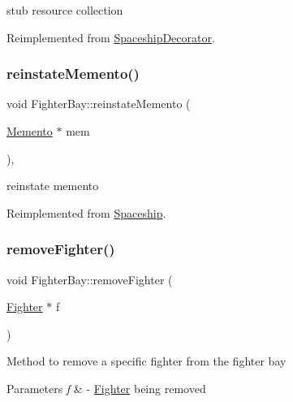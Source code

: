 stub resource collection 

Reimplemented from \hyperlink{classSpaceshipDecorator_a5ee7a9a8c146c85f08591e47d971dce7}{Spaceship\+Decorator}.

\mbox{\label{classFighterBay_ab7971eefc44f85b00424014916616fb6}} 
\subsubsection{\texorpdfstring{reinstate\+Memento()}{reinstateMemento()}}
{\footnotesize\ttfamily void Fighter\+Bay\+::reinstate\+Memento (\begin{DoxyParamCaption}\item[{\hyperlink{classMemento}{Memento} $\ast$}]{mem }\end{DoxyParamCaption})\hspace{0.3cm}{\ttfamily [inline]}, {\ttfamily [virtual]}}

reinstate memento 

Reimplemented from \hyperlink{classSpaceship_ab075c869473344b6471c8e28ca7ea61e}{Spaceship}.

\mbox{\label{classFighterBay_ab504d923d2e3837c29c56453bd1f7ba1}} 
\subsubsection{\texorpdfstring{remove\+Fighter()}{removeFighter()}}
{\footnotesize\ttfamily void Fighter\+Bay\+::remove\+Fighter (\begin{DoxyParamCaption}\item[{\hyperlink{classFighter}{Fighter} $\ast$}]{f }\end{DoxyParamCaption})}

Method to remove a specific fighter from the fighter bay 
\begin{DoxyParams}{Parameters}
{\em f} & -\/ \hyperlink{classFighter}{Fighter} being removed \\
\hline
\end{DoxyParams}
\mbox{\label{classFighterBay_a32655a70f39312f94403d9aada55788b}} 
